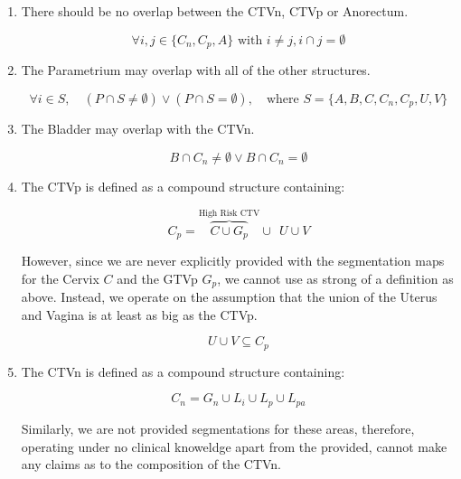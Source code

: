 \documentclass[11pt,twoside]{report}
\begin{document}
\begin{enumerate}
  \item There should be no overlap between the CTVn, CTVp or Anorectum.

        \begin{equation}\label{eq:ctvn-ctvp-anorectum}
          \forall{i,j \in \{C_n, C_p, A\}}\text{ with } i \neq j, i \cap j = \emptyset
        \end{equation}

  \item The Parametrium may overlap with all of the other structures.

        \begin{equation}\label{eq:parametrium}
          \forall i \in S, \quad (P \cap S \neq \emptyset) \vee (P \cap S = \emptyset), \quad \text{where } S = \{A, B, C, C_n, C_p, U, V\}
        \end{equation}

  \item The Bladder may overlap with the CTVn.

        \begin{equation}\label{eq:bladder-ctvn}
          B \cap C_n \neq \emptyset \vee B \cap C_n = \emptyset
        \end{equation}

  \item The CTVp is defined as a compound structure containing:

        \begin{equation}
          C_p = \overbrace{C \cup G_p}^{\text{High Risk CTV}} \cup \ \ U \cup V\label{eq:ctvp1}
        \end{equation}

  However, since we are never explicitly provided with the segmentation maps for the Cervix $C$ and the GTVp $G_p$, we cannot use as strong of a definition as above. Instead, we operate on the assumption that the union of the Uterus and Vagina is at least as big as the CTVp.

        \begin{equation}
          U \cup V \subseteq C_p\label{eq:ctvp2}
        \end{equation}

  \item The CTVn is defined as a compound structure containing:

        \begin{equation}\label{eq:ctvn-lymph}
          C_n = G_n \cup L_i \cup L_p \cup L_{pa}
        \end{equation}

  Similarly, we are not provided segmentations for these areas, therefore, operating under no clinical knoweldge apart from the provided, cannot make any claims as to the composition of the CTVn.

\end{enumerate}
\end{document}
